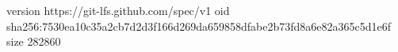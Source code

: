 version https://git-lfs.github.com/spec/v1
oid sha256:7530ea10c35a2cb7d2d3f166d269da659858dfabe2b73fd8a6e82a365c5d1e6f
size 282860

